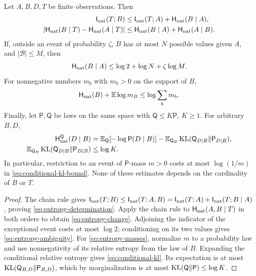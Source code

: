 \begin{lemma}
\label{lem:entropy-restriction}
Let $A,B,D,T$ be finite observations.
Then
\begin{align}
 \mathsf I_{\mathrm{nat}}(T;B)&\le\mathsf I_{\mathrm{nat}}(T;A)+\mathsf H_{\mathrm{nat}}(B\mid A),\label{eq:entropy-determination}\\
 |\mathsf H_{\mathrm{nat}}(B\mid T)-\mathsf H_{\mathrm{nat}}(A\mid T)|
 &\le\mathsf H_{\mathrm{nat}}(B\mid A)+\mathsf H_{\mathrm{nat}}(A\mid B).\label{eq:entropy-change}
\end{align}
If, outside an event of probability $\zeta$, $B$ has at most $N$ possible
values given $A$, and $|\mathcal B|\le M$, then
\begin{equation}
 \mathsf H_{\mathrm{nat}}(B\mid A)\le\log2+\log N+\zeta\log M.
 \label{eq:entropy-ambiguity}
\end{equation}
For nonnegative numbers $m_b$ with $m_b>0$ on the support of $B$,
\begin{equation}
 \mathsf H_{\mathrm{nat}}(B)+\mathbb E\log m_B\le\log\sum_bm_b.
 \label{eq:entropy-masses}
\end{equation}
Finally, let $\mathsf P,\mathsf Q$ be laws on the same space with
$\mathsf Q\le K\mathsf P$, $K\ge1$.  For arbitrary $B,D$,
\begin{align}
 \mathsf H_{\mathrm{nat}}^{\mathsf Q}(D\mid B)
 &=\mathbb E_{\mathsf Q}[-\log\mathsf P(D\mid B)]
   -\mathbb E_{\mathsf Q_B}
     \operatorname{KL}(\mathsf Q_{D\mid B}\Vert\mathsf P_{D\mid B}),\label{eq:conditional-kl}\\
 \mathbb E_{\mathsf Q_B}
     \operatorname{KL}(\mathsf Q_{D\mid B}\Vert\mathsf P_{D\mid B})
 &\le\log K.\label{eq:conditional-kl-bound}
\end{align}
In particular, restriction to an event of $\mathsf P$-mass $m>0$ costs
at most $\log(1/m)$ in \eqref{eq:conditional-kl-bound}.
None of these estimates depends on the cardinality of $B$ or $T$.
\end{lemma}

\begin{proof}
The chain rule gives
$\mathsf I_{\mathrm{nat}}(T;B)\le\mathsf I_{\mathrm{nat}}(T;A,B)
=\mathsf I_{\mathrm{nat}}(T;A)+\mathsf I_{\mathrm{nat}}(T;B\mid A)$, proving
\eqref{eq:entropy-determination}.  Apply the chain rule to
$\mathsf H_{\mathrm{nat}}(A,B\mid T)$ in both orders to obtain
\eqref{eq:entropy-change}.  Adjoining the indicator of the exceptional
event costs at most $\log2$; conditioning on its two values gives
\eqref{eq:entropy-ambiguity}.  For \eqref{eq:entropy-masses}, normalize
$m$ to a probability law and use nonnegativity of its relative entropy
from the law of $B$.  Expanding the conditional relative entropy gives
\eqref{eq:conditional-kl}.  Its expectation is at most
$\operatorname{KL}(\mathsf Q_{B,D}\Vert\mathsf P_{B,D})$, which by marginalization
is at most $\operatorname{KL}(\mathsf Q\Vert\mathsf P)\le\log K$.
\end{proof}


